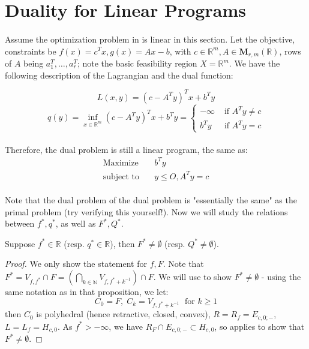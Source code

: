 \section{Duality for Linear Programs}
\label{sect:043}

\paragraph{}Assume the optimization problem in  is linear in this section. Let the objective, constraints be $f(x)=c^Tx,g(x)=Ax-b$, with $c\in \mathbb{R}^m,A\in \mathbf{M}_{r,m}(\mathbb{R})$, rows of $A$ being $a_1^T,\dotsc,a_r^T$; note the basic feasibility region $X=\mathbb{R}^m$. We have the following description of the Lagrangian and the dual function:

\[
	L(x,y) = (c-A^Ty)^Tx+b^Ty
\]
\[
	q(y) = \inf_{x\in \mathbb{R}^m} (c-A^Ty)^Tx + b^Ty=\begin{cases}
		-\infty & \text{ if }A^Ty\neq c \\
		b^Ty    & \text{ if }A^Ty=c
	\end{cases}
\]

\paragraph{}Therefore, the dual problem is still a linear program, the same as:
\begin{align*}
	\text{Maximize}\quad   & b^Ty           \\
	\text{subject to}\quad & y\leq O,A^Ty=c
\end{align*}

\paragraph{}Note that the dual problem of the dual problem is "essentially the same" as the primal problem (try verifying this yourself!). Now we will study the relations between $f^\ast,q^\ast$, as well as $F^\ast,Q^\ast$.

\begin{prop}\label{prop:043-linear-reachability}
	Suppose $f^\ast\in \mathbb{R}$ (resp. $q^\ast\in \mathbb{R}$), then $F^\ast\neq\emptyset$ (resp. $Q^\ast\neq\emptyset$).
\end{prop}

\begin{proof}
	We only show the statement for $f,F$. Note that $F^\ast=V_{f,f^\ast}\cap F=\left(\bigcap_{k\in \mathbb{N}}V_{f,f^\ast+ k^{-1}}\right)\cap F$. We will use  to show $F^\ast\neq\emptyset$ - using the same notation as in that proposition, we let:
	\[
		C_0=F,\;C_k=V_{f,f^\ast+k^{-1}}\;\text{ for }k\geq 1
	\]
	then $C_0$ is polyhedral (hence retractive, closed, convex), $R=R_f=E_{c,0;-}$, $L=L_f=H_{c,0}$. As $f^\ast>-\infty$, we have $R_F\cap E_{c,0;-}\subset H_{c,0}$, so  applies to show that $F^\ast\neq\emptyset$.
\end{proof}

